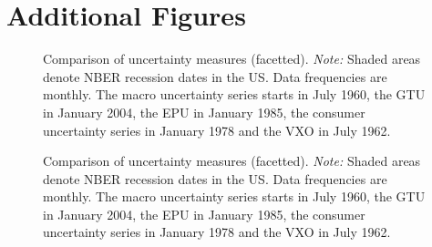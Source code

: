 \documentclass[a4paper,11pt,listof=nochaptergap,oneside,pointednumbers,bibtotoc,bigheadings,liststotoc]{scrbook}
\theoremstyle{mysatz}
\theoremstyle{mydefinition}
\theoremstyle{mybemerkung}
\begin{document}
\section{Additional Figures}
\begin{landscape}
\begin{figure}[!t]
   \centering
   \setlength\fboxsep{0pt}
   \setlength\fboxrule{0pt}
      \caption[Comparison of uncertainty measures (combined).]{Comparison of uncertainty measures (facetted).
      \textit{Note:} Shaded areas denote NBER recession dates in the US. Data frequencies are monthly. The macro uncertainty series starts in July 1960, the GTU in January 2004, the EPU in January 1985, the consumer uncertainty series in January 1978  and the VXO in July 1962.}   \label{fig:comparison_plot_combined}
\end{figure}
\end{landscape}



\begin{landscape}
\begin{figure}[!t]
   \centering
   \setlength\fboxsep{0pt}
   \setlength\fboxrule{0pt}
      \caption[Comparison of uncertainty measures (combined).]{Comparison of uncertainty measures (facetted).
      \textit{Note:} Shaded areas denote NBER recession dates in the US. Data frequencies are monthly. The macro uncertainty series starts in July 1960, the GTU in January 2004, the EPU in January 1985, the consumer uncertainty series in January 1978  and the VXO in July 1962.}   \label{fig:bloom_shock_all_until2016}
\end{figure}
\end{landscape}
\end{document}
